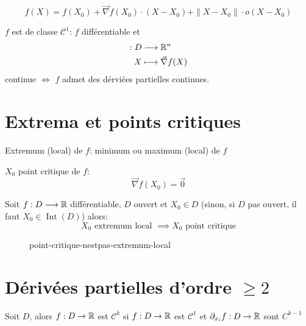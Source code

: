 \[
    f(X) = f(X_0) + \vec{\nabla}f(X_0)\cdot (X - X_0) + \|X - X_0\| \cdot o(X - X_0)
\] 

\begin{prop}
    $f$ est de classe  $\mathcal{C}^1$:  $f$ différentiable et 
    \begin{align*}
        : D &\longrightarrow \mathbb{R}^n \\
        X &\longmapsto \vec{\nabla}f(X)
    \end{align*} continue $\iff$ $f$ admet des dérviées partielles continues.
\end{prop}

\section{Extrema et points critiques}
\begin{definition}
    Extremum (local) de $f$: minimum ou maximum (local) de  $f$
\end{definition}

\begin{definition}
    $X_0$ point critique de $f$: 
     \[
         \vec{\nabla}f(X_0) = \vec{0}
    \] 
\end{definition}

\begin{theorem}
    Soit $f: D \longrightarrow \mathbb{R}$ différentiable, $D$ ouvert et  $X_0 \in D$ (sinon, si $D$ pas ouvert, il faut  $X_0 \in \operatorname{Int}(D)$) alors:
    \[
        X_0 \text{ extremum local } \implies X_0 \text{ point critique} 
    \] 
\end{theorem}

\begin{eg}
\begin{figure}[H]
    \centering
    \caption{point-critique-nestpas-extremum-local}
    \label{fig:point-critique-nestpas-extremum-local}
\end{figure}
\end{eg}

\section{Dérivées partielles d'ordre $\ge 2$}
\begin{definition}
    Soit $D$, alors  $f: D \to \mathbb{R}$ est $\mathcal{C}^k$ si  $f: D \to \mathbb{R}$ est $\mathcal{C}^1$ et  $\partial_{x_i}f: D \to \mathbb{R}$ sont $C^{k-1}$
\end{definition}

